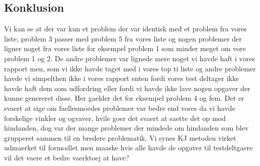 \documentclass[12pt]{article}
\begin{document}
\subsection*{Konklusion}
Vi kan se at der var kun et problem der var identisk med et problem fra vores liste, problem 3 passer med problem 5 fra vores liste og nogen problemer der ligner noget fra vores liste for eksempel problem 1 som minder meget om vore problem 1 og 2. De andre problemer var lignede mere noget vi havde haft i vores rapport men, som vi ikke havde taget med i vores top ti liste og andre problemer havde vi simpelthen ikke i vores rapport enten fordi vores test deltager ikke havde haft dem som udfordring eller fordi vi havde ikke lave nogen opgaver der kunne genereret disse. Her gaelder det for eksempel problem 4 og fem. 
Det er svaert at sige om faellesmoedes problemer var bedre end vores da vi havde forskelige vinkler og ogvaver, hvile goer det svaert at saette det op mod hindanden, dog var der mange problemer der mindede om hindanden som blev grupperet sammen til en bredere problematik. Vi synes KJ metoden virket udmaerket til formodlet men maaske hvis alle havde de opgaver til testdeltgaere vil det vaere et bedre vaerktoej at have?
\end{document}
